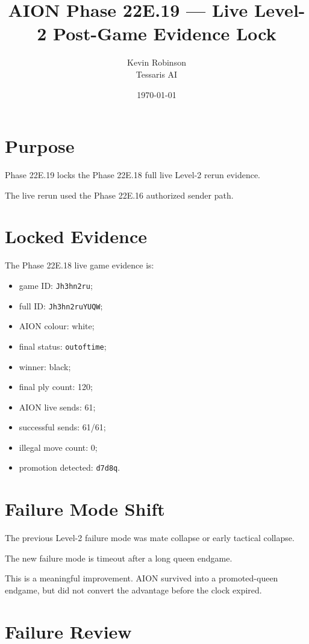 \documentclass[11pt,a4paper]{article}
\title{\textbf{AION Phase 22E.19 --- Live Level-2 Post-Game Evidence Lock}}
\author{Kevin Robinson\\Tessaris AI}
\date{\today}
\begin{document}
\maketitle

\section{Purpose}

Phase 22E.19 locks the Phase 22E.18 full live Level-2 rerun evidence.

The live rerun used the Phase 22E.16 authorized sender path.

\section{Locked Evidence}

The Phase 22E.18 live game evidence is:

\begin{itemize}[leftmargin=*]
  \item game ID: \texttt{Jh3hn2ru};
  \item full ID: \texttt{Jh3hn2ruYUQW};
  \item AION colour: white;
  \item final status: \texttt{outoftime};
  \item winner: black;
  \item final ply count: 120;
  \item AION live sends: 61;
  \item successful sends: 61/61;
  \item illegal move count: 0;
  \item promotion detected: \texttt{d7d8q}.
\end{itemize}

\section{Failure Mode Shift}

The previous Level-2 failure mode was mate collapse or early tactical collapse.

The new failure mode is timeout after a long queen endgame.

This is a meaningful improvement. AION survived into a promoted-queen endgame, but did not convert the advantage before the clock expired.

\section{Failure Review}
\end{document}

